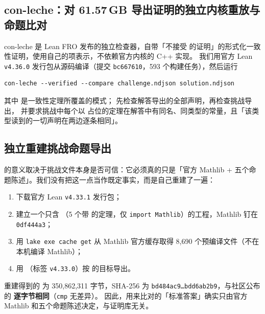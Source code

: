 \subsection{con-leche：对 61.57\,GB 导出证明的独立内核重放与命题比对}
\label{sec:conleche}

con-leche 是 Lean FRO 发布的独立检查器，自带「不接受  的证明」的形式化一致性证明，使用自己的项表示，不依赖官方内核的 C++ 实现。
我们用官方 Lean \texttt{v4.36.0} 发行包从源码编译（提交 \texttt{bc667610}，593 个构建任务），然后运行
\begin{Verbatim}[fontsize=\small,frame=single,rulecolor=\color{gray!50}]
con-leche --verified --compare challenge.ndjson solution.ndjson
\end{Verbatim}
\noindent 其中  是一致性定理所覆盖的模式； 先检查解答导出的全部声明，再检查挑战导出，
并要求挑战中每个以  占位的定理在解答中有同名、同类型的常量，且「该类型读到的一切声明在两边逐条相同」。

\conlecheDetail

\subsection{独立重建挑战命题导出}
\label{sec:rebuild}

 的意义取决于挑战文件本身是否可信：它必须真的只是「官方 Mathlib + 五个命题陈述」。我们没有把这一点当作既定事实，而是自己重建了一遍：

\begin{enumerate}
\item 下载官方 Lean \texttt{v4.33.1} 发行包；
\item 建立一个只含 （5 个带  的定理，仅 \texttt{import Mathlib}）的工程，Mathlib 钉在 \texttt{0df444a3}；
\item 用 \texttt{lake exe cache get} 从 Mathlib 官方缓存取得 8,690 个预编译文件（不在本机编译 Mathlib）；
\item 用 （标签 \texttt{v4.33.0}）按  的目标导出。
\end{enumerate}

\begin{verdictbox}
重建得到的  为 350,862,311 字节，SHA-256 为 \texttt{bd484ac9…bdd6ab2b9}，与社区公布的  \textbf{逐字节相同}（\texttt{cmp} 无差异）。
因此，用来比对的「标准答案」确实只由官方 Mathlib 和五个命题陈述决定，与证明库无关。
\end{verdictbox}

